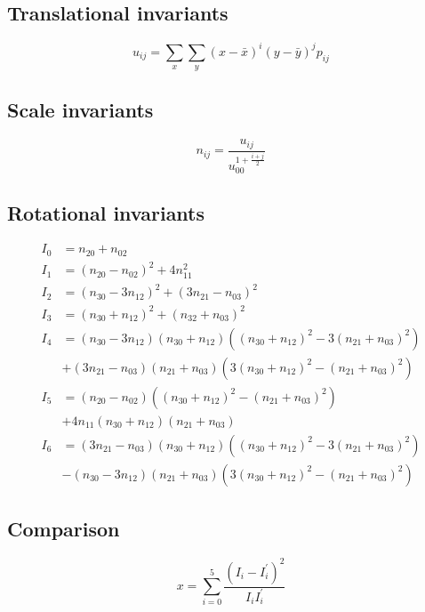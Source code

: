 \documentclass[]{article}
\begin{document}
\subsection{Translational invariants}\label{translational-invariants}

\[
u_{ij} = \sum_x \sum_y (x - \bar{x}) ^ i (y - \bar{y}) ^ j p_{ij}
\]

\subsection{Scale invariants}\label{scale-invariants}

\[
n_{ij} = \frac{u_{ij}}{u_{00} ^ {1 + \frac{i + j}{2}}}
\]

\subsection{Rotational invariants}\label{rotational-invariants}

\[
\begin{aligned}
I_0 &= n_{20} + n_{02} \\
I_1 &= (n_{20} - n_{02}) ^ 2 + 4 n_{11}^2 \\
I_2 &= (n_{30} - 3 n_{12}) ^ 2 + (3 n_{21} - n_{03}) ^ 2 \\
I_3 &= (n_{30} + n_{12}) ^ 2 + (n_{32} + n_{03}) ^ 2 \\
I_4 &= (n_{30} - 3 n_{12}) (n_{30} + n_{12})
        \left((n_{30} + n_{12}) ^ 2 - 3 (n_{21} + n_{03}) ^ 2\right) \\
        &+ (3 n_{21} - n_{03}) (n_{21} + n_{03})
        \left(3 (n_{30} + n_{12}) ^ 2 - (n_{21} + n_{03}) ^ 2\right) \\
I_5 &= (n_{20} - n_{02})
        \left((n_{30} + n_{12}) ^ 2 - (n_{21} + n_{03}) ^ 2\right) \\
        &+ 4 n_{11} (n_{30} + n_{12}) (n_{21} + n_{03}) \\
I_6 &= (3 n_{21} - n_{03}) (n_{30} + n_{12})
        \left((n_{30} + n_{12}) ^ 2 - 3 (n_{21} + n_{03}) ^ 2 \right) \\
        &- (n_{30} - 3 n_{12}) (n_{21} + n_{03})
        \left(3 (n_{30} + n_{12}) ^ 2 - (n_{21} + n_{03}) ^ 2 \right)
\end{aligned}
\]

\newpage

\subsection{Comparison}\label{comparison}

\[
x = \sum_{i=0}^5 \frac{(I_i - I^\prime_i) ^ 2}{I_i I^\prime_i}
\]
\end{document}

